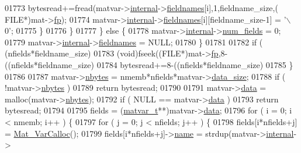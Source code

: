 \begin{DoxyCode}
{{{{{{{{{{{{{{{01773                     bytesread+=fread(matvar->\hyperlink{group___m_a_t_a6e97e3ed9f40c49322c18561c2a94e92}{internal}->\hyperlink{structmatvar__internal_a7574d000bfc98ad4860ae6590b8d4985}{fieldnames}[i],1,fieldname\_size,(
      FILE*)mat->\hyperlink{struct__mat__t_a85f562e407ca9ad4d2a6e14f839432b7}{fp});
01774                     matvar->\hyperlink{group___m_a_t_a6e97e3ed9f40c49322c18561c2a94e92}{internal}->\hyperlink{structmatvar__internal_a7574d000bfc98ad4860ae6590b8d4985}{fieldnames}[i][fieldname\_size-1] = \textcolor{charliteral}{'\(\backslash\)0'};
01775                 \}
01776             \}
01777         \} \textcolor{keywordflow}{else} \{
01778             matvar->\hyperlink{group___m_a_t_a6e97e3ed9f40c49322c18561c2a94e92}{internal}->\hyperlink{structmatvar__internal_a93fc447484f455eddf9334f2e9e411c2}{num\_fields} = 0;
01779             matvar->\hyperlink{group___m_a_t_a6e97e3ed9f40c49322c18561c2a94e92}{internal}->\hyperlink{structmatvar__internal_a7574d000bfc98ad4860ae6590b8d4985}{fieldnames} = NULL;
01780         \}
01781 
01782         \textcolor{keywordflow}{if} ( (nfields*fieldname\_size) %
01783             (void)fseek((FILE*)mat->\hyperlink{struct__mat__t_a85f562e407ca9ad4d2a6e14f839432b7}{fp},8-((nfields*fieldname\_size) %
01784             bytesread+=8-((nfields*fieldname\_size) %
01785         \}
01786 
01787         matvar->\hyperlink{group___m_a_t_abf1c844540503be2df9bb3db93cfe307}{nbytes} = nmemb*nfields*matvar->\hyperlink{group___m_a_t_a9ad1c82e2b568da617e12dc73a26e1f9}{data\_size};
01788         \textcolor{keywordflow}{if} ( !matvar->\hyperlink{group___m_a_t_abf1c844540503be2df9bb3db93cfe307}{nbytes} )
01789             \textcolor{keywordflow}{return} bytesread;
01790 
01791         matvar->\hyperlink{group___m_a_t_a5672978efa230bbdecdf38ede781f7fa}{data} = malloc(matvar->\hyperlink{group___m_a_t_abf1c844540503be2df9bb3db93cfe307}{nbytes});
01792         \textcolor{keywordflow}{if} ( NULL == matvar->\hyperlink{group___m_a_t_a5672978efa230bbdecdf38ede781f7fa}{data} )
01793             \textcolor{keywordflow}{return} bytesread;
01794 
01795         fields = (\hyperlink{group___m_a_t_structmatvar__t}{matvar\_t}**)matvar->\hyperlink{group___m_a_t_a5672978efa230bbdecdf38ede781f7fa}{data};
01796         for ( i = 0; i < nmemb; i++ ) \{
01797             \textcolor{keywordflow}{for} ( j = 0; j < nfields; j++ ) \{
01798                 fields[i*nfields+j] = \hyperlink{group___m_a_t_gae7c9c3699f6e9c31a9c490300013098c}{Mat\_VarCalloc}();
01799                 fields[i*nfields+j]->\hyperlink{group___m_a_t_a5d4b55b041e3b4fb50c04337f05ad909}{name} = strdup(matvar->\hyperlink{group___m_a_t_a6e97e3ed9f40c49322c18561c2a94e92}{internal}->
}}}}}}}}}}}}}}}
\end{DoxyCode}

